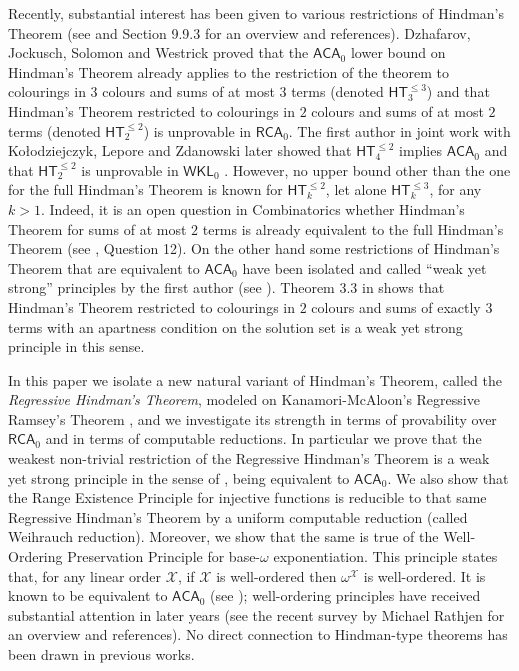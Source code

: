\documentclass[a4paper,11pt]{article}
\newcommand\RCA{\mathsf{RCA}}
\newcommand\ACA{\mathsf{ACA}}
\newcommand\WKL{\mathsf{WKL}}
\newcommand\HT{\mathsf{HT}}
\newcommand\ordX{\mathcal{X}}
\begin{document}
Recently, substantial interest has been given to various restrictions of Hindman's Theorem (see \cite{Car:2021} and \cite{Dza-Mum:22} Section 9.9.3 for an overview and references). Dzhafarov, Jockusch, Solomon and Westrick \cite{DJSW:16} proved that the $\ACA_0$ lower bound on Hindman's Theorem already applies to the restriction of the theorem to colourings in $3$ colours and sums of at most $3$ terms (denoted $\HT^{\leq 3}_3$) and that Hindman's Theorem restricted to colourings in $2$ colours and sums of at most $2$ terms (denoted $\HT^{\leq 2}_2$) is unprovable in $\RCA_0$.
The first author in joint work with Ko{\l}odziejczyk, Lepore and Zdanowski later showed that $\HT^{\leq 2}_4$ implies $\ACA_0$ and
that $\HT^{\leq 2}_2$ is unprovable in $\WKL_0$ \cite{Car-Kol-Lep-Zda:20}.
However, no upper bound other than the one for the full Hindman's Theorem is known for $\HT^{\leq 2}_k$, let alone $\HT^{\leq 3}_k$, for any $k > 1$. Indeed, it is an open question in Combinatorics whether Hindman's Theorem for sums of at most $2$ terms is already equivalent to the full Hindman's Theorem (see \cite{Hin-Lea-Str:03}, Question 12).
On the other hand some restrictions of Hindman's Theorem that are equivalent to $\ACA_0$ have been isolated and called ``weak yet strong'' principles by the first author (see \cite{Car:16:wys}). Theorem 3.3 in \cite{Car-Kol-Lep-Zda:20} shows that Hindman's Theorem restricted to colourings in $2$ colours and sums of exactly $3$ terms with an apartness condition on the solution set is a weak yet strong principle in this sense.

In this paper we isolate a new natural variant of Hindman's Theorem, called the {\em Regressive Hindman's Theorem}, modeled on 
Kanamori-McAloon's Regressive Ramsey's Theorem \cite{Kan-McA:87}, and we investigate its strength in terms of provability over $\RCA_0$ and in terms of computable reductions. In particular we prove that the weakest non-trivial restriction of the Regressive Hindman's Theorem is a weak yet strong principle in the sense of \cite{Car:16:wys}, being equivalent to $\ACA_0$. We also show that the Range Existence Principle for injective functions is reducible to that same Regressive Hindman's Theorem by a uniform computable reduction (called Weihrauch reduction). Moreover, we show that the same is true of the Well-Ordering Preservation Principle for base-$\omega$ exponentiation. This principle states that, for any linear order $\ordX$, if $\ordX$ is well-ordered then $\omega^\ordX$ is well-ordered. It is known to be equivalent to $\ACA_0$ (see \cite{Hir:94}); well-ordering principles have received substantial attention in later years (see the recent survey by Michael Rathjen \cite{Rat:wop:pre} for an overview and references). No direct connection to Hindman-type theorems
has been drawn in previous works.
\end{document}
